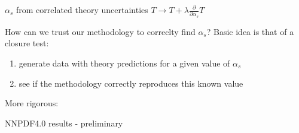 \documentclass[aspectratio=169, 9pt,t]{beamer}
\begin{document}
\begin{frame}{$\alpha_s$ from correlated theory uncertainties}
  $T \rightarrow T + \lambda \frac{\partial}{\partial \alpha_s}T $
\end{frame}


\begin{frame}{How can we trust our methodology to correclty find $\alpha_s$?}
  Basic idea is that of a closure test:
  \begin{enumerate}
    \item generate data with theory predictions for a given value of $\alpha_s$
    \item see if the methodology correctly reproduces this known value
  \end{enumerate}

  More rigorous:
\end{frame}


\begin{frame}{NNPDF4.0 results - preliminary}
\end{frame}
\end{document}
